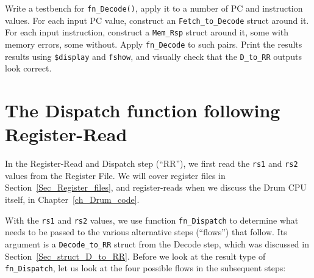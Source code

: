 \Exercise

Write a testbench for \verb|fn_Decode()|, apply it to a number of PC
and instruction values.  For each input PC value, construct an
\verb|Fetch_to_Decode| struct around it.  For each input instruction,
construct a \verb|Mem_Rsp| struct around it, some with memory errors,
some without.  Apply \verb|fn_Decode| to such pairs.  Print the
results results using \verb|$display| and \verb|fshow|, and visually
check that the \verb|D_to_RR| outputs look correct.

\Endexercise


\section{The Dispatch function following Register-Read}

\label{Sec_Dispatch_function}


In the Register-Read and Dispatch step (``RR''), we first read the
\verb|rs1| and \verb|rs2| values from the Register File.  We will
cover register files in Section~\ref{Sec_Register_files}, and
register-reads when we discuss the Drum CPU itself, in
Chapter~\ref{ch_Drum_code}.

With the \verb|rs1| and \verb|rs2| values, we use function
\verb|fn_Dispatch| to determine what needs to be passed to the various
alternative steps (``flows'') that follow.  Its argument is a
\verb|Decode_to_RR| struct from the Decode step, which was discussed
in Section~\ref{Sec_struct_D_to_RR}.  Before we look at the result
type of \verb|fn_Dispatch|, let us look at the four possible flows in
the subsequent steps:

